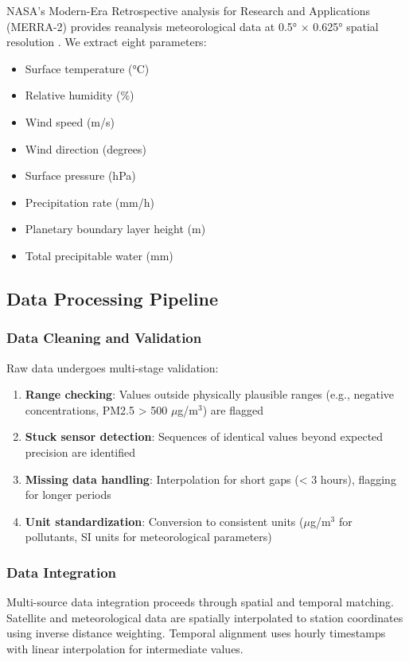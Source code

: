 \documentclass[12pt]{article}
\begin{document}
NASA's Modern-Era Retrospective analysis for Research and Applications (MERRA-2) provides reanalysis meteorological data at 0.5° × 0.625° spatial resolution \citep{johnson2024meteorological}. We extract eight parameters:
\begin{itemize}
\item Surface temperature (°C)
\item Relative humidity (\%)
\item Wind speed (m/s)
\item Wind direction (degrees)
\item Surface pressure (hPa)
\item Precipitation rate (mm/h)
\item Planetary boundary layer height (m)
\item Total precipitable water (mm)
\end{itemize}

\subsection{Data Processing Pipeline}

\subsubsection{Data Cleaning and Validation}

Raw data undergoes multi-stage validation:

\begin{enumerate}
\item \textbf{Range checking}: Values outside physically plausible ranges (e.g., negative concentrations, PM2.5 > 500 $\mu$g/m$^3$) are flagged
\item \textbf{Stuck sensor detection}: Sequences of identical values beyond expected precision are identified
\item \textbf{Missing data handling}: Interpolation for short gaps (< 3 hours), flagging for longer periods
\item \textbf{Unit standardization}: Conversion to consistent units ($\mu$g/m$^3$ for pollutants, SI units for meteorological parameters)
\end{enumerate}

\subsubsection{Data Integration}

Multi-source data integration proceeds through spatial and temporal matching. Satellite and meteorological data are spatially interpolated to station coordinates using inverse distance weighting. Temporal alignment uses hourly timestamps with linear interpolation for intermediate values.
\end{document}
